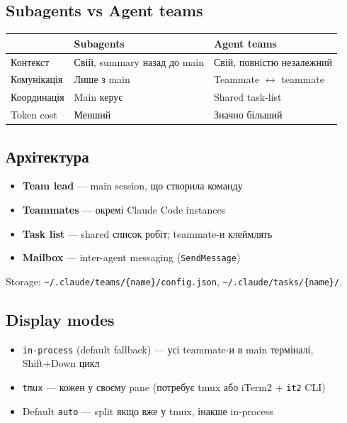 \documentclass[11pt,a4paper]{article}
\begin{document}
\subsection{Subagents vs Agent teams}

\begin{tabular}{lll}
\hline
& \textbf{Subagents} & \textbf{Agent teams} \\
\hline
Контекст & Свій, summary назад до main & Свій, повністю незалежний \\
Комунікація & Лише з main & Teammate $\leftrightarrow$ teammate \\
Координація & Main керує & Shared task-list \\
Token cost & Менший & Значно більший \\
\hline
\end{tabular}

\subsection{Архітектура}

\begin{itemize}
  \item \textbf{Team lead} --- main session, що створила команду
  \item \textbf{Teammates} --- окремі Claude Code instances
  \item \textbf{Task list} --- shared список робіт; teammate-и клеймлять
  \item \textbf{Mailbox} --- inter-agent messaging (\texttt{SendMessage})
\end{itemize}

Storage: \texttt{\textasciitilde/.claude/teams/\{name\}/config.json}, \texttt{\textasciitilde/.claude/tasks/\{name\}/}.

\subsection{Display modes}

\begin{itemize}
  \item \texttt{in-process} (default fallback) --- усі teammate-и в main терміналі, Shift+Down цикл
  \item \texttt{tmux} --- кожен у своєму pane (потребує tmux або iTerm2 + \texttt{it2} CLI)
  \item Default \texttt{auto} --- split якщо вже у tmux, інакше in-process
\end{itemize}
\end{document}

